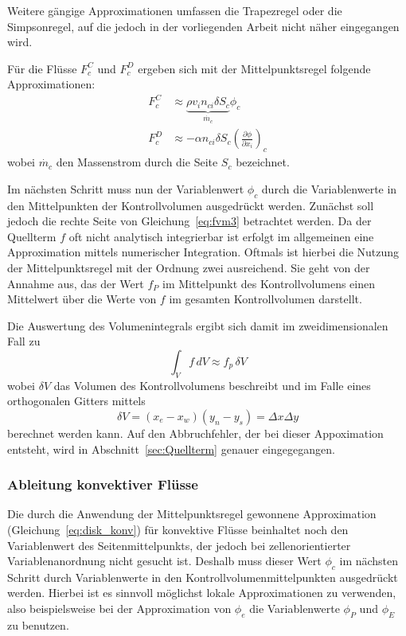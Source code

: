 Weitere gängige Approximationen umfassen die Trapezregel oder die Simpsonregel, auf die jedoch
in der vorliegenden Arbeit nicht näher eingegangen wird.

Für die Flüsse $F_c^C$ und $F_c^D$ ergeben sich mit der Mittelpunktsregel folgende Approximationen:
\begin{align}
  F_c^C &\approx \underbrace{\rho v_i n_{ci} \delta S_c}_{\dot{m_c}}  \phi_c \label{eq:disk_konv}\\
  F_c^D &\approx  -\alpha  n_{ci} \delta S_c \left(\frac{\partial \phi}{\partial x_i}\right)_c\label{eq:disk_dif}
\end{align}
wobei $\dot{m_c}$ den Massenstrom durch die Seite $S_c$ bezeichnet.

Im nächsten Schritt muss nun der Variablenwert $\phi_c$ durch die Variablenwerte in den
Mittelpunkten der Kontrollvolumen ausgedrückt werden.
Zunächst soll jedoch die rechte Seite von Gleichung~\eqref{eq:fvm3} betrachtet werden.
Da der Quellterm $f$ oft nicht analytisch integrierbar ist erfolgt im allgemeinen eine Approximation
mittels numerischer Integration. Oftmals ist hierbei die Nutzung der Mittelpunktsregel mit der Ordnung zwei
ausreichend. Sie geht von der Annahme aus, das der Wert $f_P$ im Mittelpunkt des Kontrollvolumens
einen Mittelwert über die Werte von $f$ im gesamten Kontrollvolumen darstellt.

Die Auswertung des Volumenintegrals ergibt sich damit im zweidimensionalen Fall zu
\begin{equation}
  \int_V f\,dV \approx f_p\,\delta V
\end{equation}
wobei $\delta V$ das Volumen des Kontrollvolumens beschreibt und im Falle eines orthogonalen Gitters
mittels
\begin{equation}
  \delta V = (x_e - x_w)(y_n-y_s) = \Delta x \Delta y
\end{equation}
berechnet werden kann. Auf den Abbruchfehler, der bei dieser Appoximation entsteht, wird in
Abschnitt~\ref{sec:Quellterm} genauer eingegegangen.


\subsubsection{Ableitung konvektiver Flüsse}
\label{sec:konv_fluss}

Die durch die Anwendung der Mittelpunktsregel gewonnene Approximation (Gleichung~\ref{eq:disk_konv}) für konvektive
Flüsse beinhaltet noch den Variablenwert des Seitenmittelpunkts, der jedoch bei
zellenorientierter Variablenanordnung nicht gesucht ist. Deshalb muss dieser Wert $\phi_c$ im
nächsten Schritt durch Variablenwerte in den Kontrollvolumenmittelpunkten ausgedrückt werden.
Hierbei ist es sinnvoll möglichst lokale Approximationen zu verwenden, also beispielsweise
bei der Approximation von $\phi_e$ die Variablenwerte $\phi_P$ und $\phi_E$ zu benutzen.

